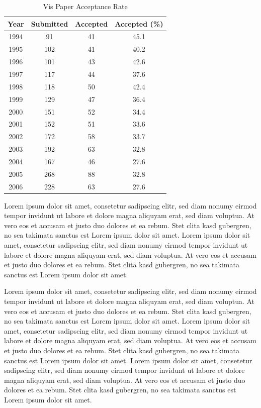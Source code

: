 \documentclass[journal]{vgtc}
\begin{document}
\begin{table}
  \caption{\label{tab:vis_accept} Vis Paper Acceptance Rate}
  \scriptsize
  \begin{center}
    \begin{tabular}{cccc}
      Year & Submitted & Accepted & Accepted (\%)\\
      \hline
      1994 &  91 & 41 & 45.1\\
      1995 & 102 & 41 & 40.2\\
      1996 & 101 & 43 & 42.6\\
      1997 & 117 & 44 & 37.6\\
      1998 & 118 & 50 & 42.4\\
      1999 & 129 & 47 & 36.4\\
      2000 & 151 & 52 & 34.4\\
      2001 & 152 & 51 & 33.6\\
      2002 & 172 & 58 & 33.7\\
      2003 & 192 & 63 & 32.8\\
      2004 & 167 & 46 & 27.6\\
      2005 & 268 & 88 & 32.8\\
      2006 & 228 & 63 & 27.6
    \end{tabular}
  \end{center}
\end{table}


Lorem ipsum dolor sit amet, consetetur sadipscing elitr, sed diam
nonumy eirmod tempor invidunt ut labore et dolore magna aliquyam erat,
sed diam voluptua. At vero eos et accusam et justo duo dolores et ea
rebum. Stet clita kasd gubergren, no sea takimata sanctus est Lorem
ipsum dolor sit amet. Lorem ipsum dolor sit amet, consetetur
sadipscing elitr, sed diam nonumy eirmod tempor invidunt ut labore et
dolore magna aliquyam erat, sed diam voluptua. At vero eos et accusam
et justo duo dolores et ea rebum. Stet clita kasd gubergren, no sea
takimata sanctus est Lorem ipsum dolor sit amet.


Lorem ipsum dolor sit amet, consetetur sadipscing elitr, sed diam
nonumy eirmod tempor invidunt ut labore et dolore magna aliquyam erat,
sed diam voluptua. At vero eos et accusam et justo duo dolores et ea
rebum. Stet clita kasd gubergren, no sea takimata sanctus est Lorem
ipsum dolor sit amet. Lorem ipsum dolor sit amet, consetetur
sadipscing elitr, sed diam nonumy eirmod tempor invidunt ut labore et
dolore magna aliquyam erat, sed diam voluptua. At vero eos et accusam
et justo duo dolores et ea rebum. Stet clita kasd gubergren, no sea
takimata sanctus est Lorem ipsum dolor sit amet. Lorem ipsum dolor sit
amet, consetetur sadipscing elitr, sed diam nonumy eirmod tempor
invidunt ut labore et dolore magna aliquyam erat, sed diam
voluptua. At vero eos et accusam et justo duo dolores et ea
rebum. Stet clita kasd gubergren, no sea takimata sanctus est Lorem
ipsum dolor sit amet.
\end{document}
